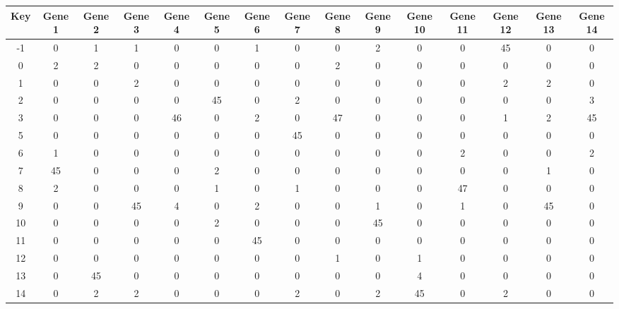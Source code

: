 \begin{tabular}{|c|c|c|c|c|c|c|c|c|c|c|c|c|c|c|}
\hline
Key & Gene 1 & Gene 2 & Gene 3 & Gene 4 & Gene 5 & Gene 6 & Gene 7 & Gene 8 & Gene 9 & Gene 10 & Gene 11 & Gene 12 & Gene 13 & Gene 14 \\
\hline
-1 & 0 & 1 & 1 & 0 & 0 & 1 & 0 & 0 & 2 & 0 & 0 & 45 & 0 & 0 \\
0 & 2 & 2 & 0 & 0 & 0 & 0 & 0 & 2 & 0 & 0 & 0 & 0 & 0 & 0 \\
1 & 0 & 0 & 2 & 0 & 0 & 0 & 0 & 0 & 0 & 0 & 0 & 2 & 2 & 0 \\
2 & 0 & 0 & 0 & 0 & 45 & 0 & 2 & 0 & 0 & 0 & 0 & 0 & 0 & 3 \\
3 & 0 & 0 & 0 & 46 & 0 & 2 & 0 & 47 & 0 & 0 & 0 & 1 & 2 & 45 \\
5 & 0 & 0 & 0 & 0 & 0 & 0 & 45 & 0 & 0 & 0 & 0 & 0 & 0 & 0 \\
6 & 1 & 0 & 0 & 0 & 0 & 0 & 0 & 0 & 0 & 0 & 2 & 0 & 0 & 2 \\
7 & 45 & 0 & 0 & 0 & 2 & 0 & 0 & 0 & 0 & 0 & 0 & 0 & 1 & 0 \\
8 & 2 & 0 & 0 & 0 & 1 & 0 & 1 & 0 & 0 & 0 & 47 & 0 & 0 & 0 \\
9 & 0 & 0 & 45 & 4 & 0 & 2 & 0 & 0 & 1 & 0 & 1 & 0 & 45 & 0 \\
10 & 0 & 0 & 0 & 0 & 2 & 0 & 0 & 0 & 45 & 0 & 0 & 0 & 0 & 0 \\
11 & 0 & 0 & 0 & 0 & 0 & 45 & 0 & 0 & 0 & 0 & 0 & 0 & 0 & 0 \\
12 & 0 & 0 & 0 & 0 & 0 & 0 & 0 & 1 & 0 & 1 & 0 & 0 & 0 & 0 \\
13 & 0 & 45 & 0 & 0 & 0 & 0 & 0 & 0 & 0 & 4 & 0 & 0 & 0 & 0 \\
14 & 0 & 2 & 2 & 0 & 0 & 0 & 2 & 0 & 2 & 45 & 0 & 2 & 0 & 0 \\
\hline
\end{tabular}